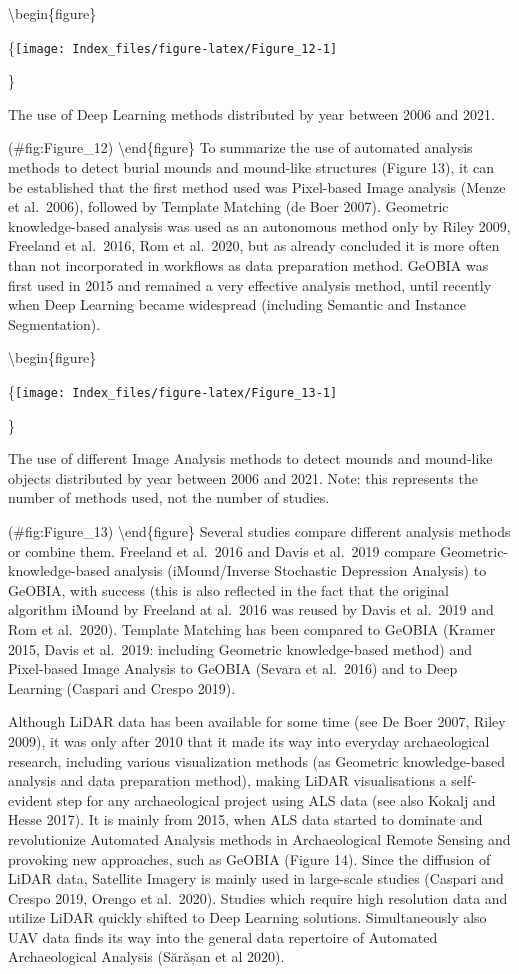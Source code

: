 \documentclass[
]{article}
\begin{document}
\textbackslash begin\{figure\}

\{\centering \texttt{[image: Index\_files/figure-latex/Figure\_12-1]}

\}

\caption{The use of Deep Learning methods distributed by year between 2006 and 2021.}

(\#fig:Figure\_12)
\textbackslash end\{figure\}
To summarize the use of automated analysis methods to detect burial mounds and mound-like structures (Figure 13), it can be established that the first method used was Pixel-based Image analysis (Menze et al.~2006), followed by Template Matching (de Boer 2007). Geometric knowledge-based analysis was used as an autonomous method only by Riley 2009, Freeland et al.~2016, Rom et al.~2020, but as already concluded it is more often than not incorporated in workflows as data preparation method. GeOBIA was first used in 2015 and remained a very effective analysis method, until recently when Deep Learning became widespread (including Semantic and Instance Segmentation).

\textbackslash begin\{figure\}

\{\centering \texttt{[image: Index\_files/figure-latex/Figure\_13-1]}

\}

\caption{The use of different Image Analysis methods to detect mounds and mound-like objects distributed by year between 2006 and 2021. Note: this represents the number of methods used, not the number of studies.}

(\#fig:Figure\_13)
\textbackslash end\{figure\}
Several studies compare different analysis methods or combine them. Freeland et al.~2016 and Davis et al.~2019 compare Geometric-knowledge-based analysis (iMound/Inverse Stochastic Depression Analysis) to GeOBIA, with success (this is also reflected in the fact that the original algorithm iMound by Freeland at al.~2016 was reused by Davis et al.~2019 and Rom et al.~2020). Template Matching has been compared to GeOBIA (Kramer 2015, Davis et al.~2019: including Geometric knowledge-based method) and Pixel-based Image Analysis to GeOBIA (Sevara et al.~2016) and to Deep Learning (Caspari and Crespo 2019).

Although LiDAR data has been available for some time (see De Boer 2007, Riley 2009), it was only after 2010 that it made its way into everyday archaeological research, including various visualization methods (as Geometric knowledge-based analysis and data preparation method), making LiDAR visualisations a self-evident step for any archaeological project using ALS data (see also Kokalj and Hesse 2017). It is mainly from 2015, when ALS data started to dominate and revolutionize Automated Analysis methods in Archaeological Remote Sensing and provoking new approaches, such as GeOBIA (Figure 14). Since the diffusion of LiDAR data, Satellite Imagery is mainly used in large-scale studies (Caspari and Crespo 2019, Orengo et al.~2020). Studies which require high resolution data and utilize LiDAR quickly shifted to Deep Learning solutions. Simultaneously also UAV data finds its way into the general data repertoire of Automated Archaeological Analysis (Sărășan et al 2020).
\end{document}
